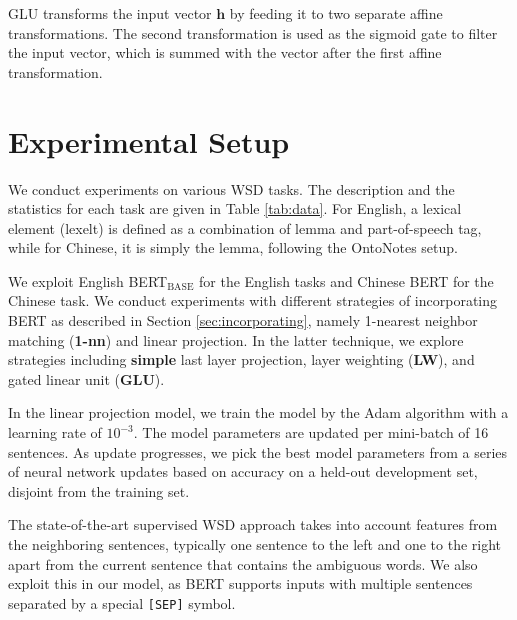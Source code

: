 \documentclass[11pt,a4paper]{article}
\begin{document}
GLU transforms the input vector $\mathbf{h}$ by feeding it to two separate affine transformations. The second transformation is used as the sigmoid gate to filter the input vector, which is summed with the vector after the first affine transformation.

\section{Experimental Setup}
\label{sec:exp}

We conduct experiments on various WSD tasks. The description and the statistics for each task are given in Table \ref{tab:data}. For English, a lexical element (lexelt) is defined as a combination of lemma and part-of-speech tag, while for Chinese, it is simply the lemma, following the OntoNotes setup.

We exploit English BERT$_\text{BASE}$ for the English tasks and Chinese BERT for the Chinese task. We conduct experiments with different strategies of incorporating BERT as described in Section \ref{sec:incorporating}, namely 1-nearest neighbor matching (\textbf{1-nn}) and linear projection. In the latter technique, we explore strategies including \textbf{simple} last layer projection, layer weighting (\textbf{LW}), and gated linear unit (\textbf{GLU}).

In the linear projection model, we train the model by the Adam algorithm \cite{kingma_adam:_2015} with a learning rate of $10^{-3}$. The model parameters are updated per mini-batch of 16 sentences. As update progresses, we pick the best model parameters from a series of neural network updates based on accuracy on a held-out development set, disjoint from the training set.

The state-of-the-art supervised WSD approach takes into account features from the neighboring sentences, typically one sentence to the left and one to the right apart from the current sentence that contains the ambiguous words. We also exploit this in our model, as BERT supports inputs with multiple sentences separated by a special \texttt{[SEP]} symbol.
\end{document}
